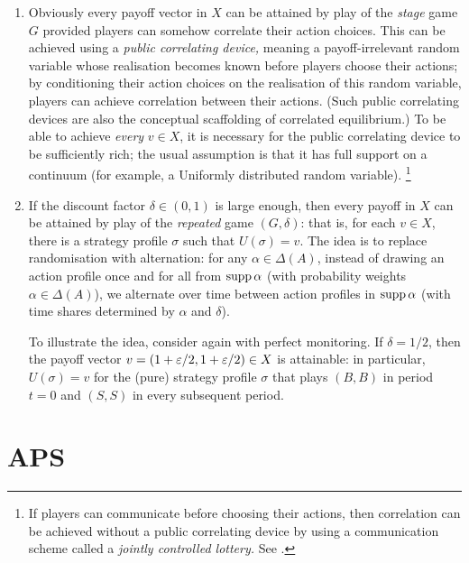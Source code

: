 \begin{remark}
\begin{enumerate}[label=(\alph*),resume]
		\item \label{item:X_converse:stage_pos} Obviously every payoff vector in $X$ can be attained by play of the \emph{stage} game $G$ provided players can somehow correlate their action choices. This can be achieved using a \emph{public correlating device,} meaning a payoff-irrelevant random variable whose realisation becomes known before players choose their actions; by conditioning their action choices on the realisation of this random variable, players can achieve correlation between their actions.
		(Such public correlating devices are also the conceptual scaffolding of correlated equilibrium.) To be able to achieve \emph{every} $v \in X$, it is necessary for the public correlating device to be sufficiently rich; the usual assumption is that it has full support on a continuum (for example, a Uniformly distributed random variable).%
			\footnote{If players can communicate before choosing their actions, then correlation can be achieved without a public correlating device by using a communication scheme called a \emph{jointly controlled lottery.} See \textcite[][p.~18]{MailathSamuelson2006}.}

		\item \label{item:X_converse:rep_pos} If the discount factor $\delta \in (0,1)$ is large enough, then every payoff in $X$ can be attained by play of the \emph{repeated} game $(G,\delta)$: that is, for each $v \in X$, there is a strategy profile $\sigma$ such that $U(\sigma) = v$. The idea is to replace randomisation with alternation: for any $\alpha \in \Delta(A)$, instead of drawing an action profile once and for all from $\operatorname*{supp} \alpha$ (with probability weights $\alpha \in \Delta(A)$), we alternate over time between action profiles in $\operatorname*{supp} \alpha$ (with time shares determined by $\alpha$ and $\delta$).

		To illustrate the idea, consider again  with perfect monitoring. If $\delta=1/2$, then the payoff vector $v = \left( 1+\eps/2, 1+\eps/2 \right) \in X$ is attainable: in particular, $U(\sigma)=v$ for the (pure) strategy profile $\sigma$ that plays $(B,B)$ in period $t=0$ and $(S,S)$ in every subsequent period.

	\end{enumerate}
\end{remark}



\section{APS}
\label{aps:selfgen}


